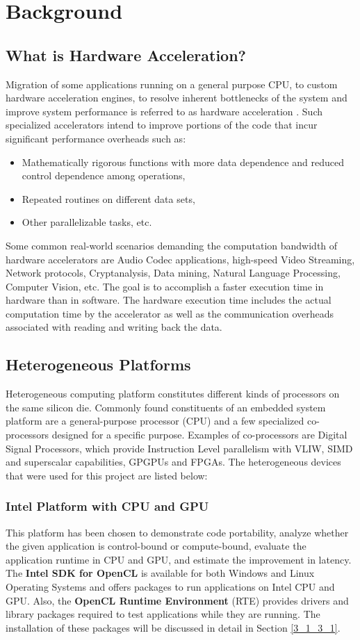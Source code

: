 \chapter{Background}
\label{ch2_background}
\section{What is Hardware Acceleration?}
\label{sect2_1}
Migration of some applications running on a general purpose CPU, to custom hardware acceleration engines, to resolve inherent bottlenecks of the system and improve system performance is referred to as hardware acceleration \cite{wiki_hwacc}. Such specialized accelerators intend to improve portions of the code that incur significant performance overheads such as:
\begin{itemize}
\item Mathematically rigorous functions with more data dependence and reduced control dependence among operations,
\item Repeated routines on different data sets,
\item Other parallelizable tasks, etc. 
\end{itemize}
Some common real-world scenarios demanding the computation bandwidth of hardware accelerators are Audio Codec applications, high-speed Video Streaming, Network protocols, Cryptanalysis, Data mining, Natural Language Processing, Computer Vision, etc. \cite{ibm_devworks} The goal is to accomplish a faster execution time in hardware than in software. The hardware execution time includes the actual computation time by the accelerator as well as the communication overheads associated with reading and writing back the data. 

\section{Heterogeneous Platforms}
\label{sect2_2}
Heterogeneous computing platform constitutes different kinds of processors on the same silicon die. Commonly found constituents of an embedded system platform are a general-purpose processor (CPU) and a few specialized co-processors designed for a specific purpose. Examples of co-processors are Digital Signal Processors, which provide Instruction Level parallelism with VLIW, SIMD and superscalar capabilities, GPGPUs and FPGAs. The heterogeneous devices that were used for this project are listed below:
\subsection{Intel Platform with CPU and GPU}
This platform has been chosen to demonstrate code portability, analyze whether the given application is control-bound or compute-bound, evaluate the application runtime in CPU and GPU, and estimate the improvement in latency. The \textbf{Intel SDK for OpenCL}\cite{intel_openclSDK} is available for both Windows and Linux Operating Systems and offers packages to run applications on Intel CPU and GPU. Also, the \textbf{OpenCL Runtime Environment} (RTE) \cite{intel_runtime} provides drivers and library packages required to test applications while they are running. The installation of these packages will be discussed in detail in Section \ref{3_1_3_1}.   
